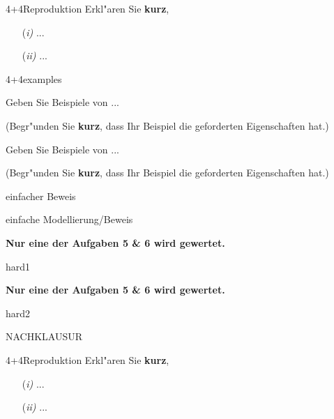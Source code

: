\documentclass[a4paper]{article}
\begin{document}
\pagebreak

\begin{klaufg}{4+4}{Reproduktion}
  Erkl"aren Sie {\bfseries\sffamily kurz},

\begin{enumerate} %
\item[(\it i)] ...
   \vfill
\item[(\it ii)] ...
 \vfill
\end{enumerate}

\end{klaufg}

\pagebreak
\begin{klaufg}{4+4}{examples}


  Geben Sie Beispiele von ...

  (Begr"unden Sie {\bfseries\sffamily kurz}, dass Ihr Beispiel die
  geforderten Eigenschaften hat.)
  \pagebreak
  
    Geben Sie Beispiele von ...
  
  (Begr"unden Sie {\bfseries\sffamily kurz}, dass Ihr Beispiel die
  geforderten Eigenschaften hat.)

\end{klaufg}

\pagebreak
\begin{klaufg}{8}{einfacher Beweis}

\end{klaufg}

\pagebreak
\begin{klaufg}{8}{einfache Modellierung/Beweis}

  
\end{klaufg}
 
\pagebreak
{\bfseries Nur eine der Aufgaben 5 \& 6 wird gewertet.}
\bigskip
\bigskip

\begin{klaufg}{8}{hard1}

\end{klaufg}

\pagebreak
{\bfseries Nur eine der Aufgaben 5 \& 6 wird gewertet.}
\bigskip
\bigskip

\begin{klaufg}{8}{hard2}

\end{klaufg}

\pagebreak
NACHKLAUSUR

\begin{klaufg}{4+4}{Reproduktion}
  Erkl"aren Sie {\bfseries\sffamily kurz},

\begin{enumerate} %
\item[(\it i)] ...
   \vfill
\item[(\it ii)] ...
 \vfill
\end{enumerate}

\end{klaufg}
\end{document}
